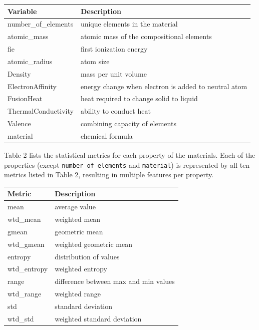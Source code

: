\documentclass{article}
\begin{document}
\begin{table}[h!]
    \centering
    \begin{tabular}{|l|l|}
    \hline
    \textbf{Variable} & \textbf{Description} \\ \hline \hline
    number\_of\_elements & unique elements in the material \\ \hline
    atomic\_mass & atomic mass of the compositional elements \\ \hline
    fie & first ionization energy \\ \hline
    atomic\_radius & atom size \\ \hline
    Density & mass per unit volume \\ \hline
    ElectronAffinity & energy change when electron is added to neutral atom \\ \hline
    FusionHeat & heat required to change solid to liquid \\ \hline
    ThermalConductivity & ability to conduct heat \\ \hline
    Valence & combining capacity of elements \\ \hline
    material & chemical formula \\ \hline
    \end{tabular}
    \label{table:basic_properties}
\end{table}

Table 2 lists the statistical metrics for each property of the materials. Each of the properties (except \texttt{number\_of\_elements} and \texttt{material}) is represented by all ten metrics listed in Table 2, resulting in multiple features per property.

\begin{table}[h!]
    \centering
    \begin{tabular}{|l|l|}
    \hline
    \textbf{Metric} & \textbf{Description} \\ \hline \hline
    mean & average value \\ \hline
    wtd\_mean & weighted mean \\ \hline
    gmean & geometric mean \\ \hline
    wtd\_gmean & weighted geometric mean \\ \hline
    entropy & distribution of values \\ \hline
    wtd\_entropy & weighted entropy \\ \hline
    range & difference between max and min values \\ \hline
    wtd\_range & weighted range \\ \hline
    std & standard deviation \\ \hline
    wtd\_std & weighted standard deviation \\ \hline
    \end{tabular}
    \label{table:statistical_measures}
\end{table}
\end{document}
